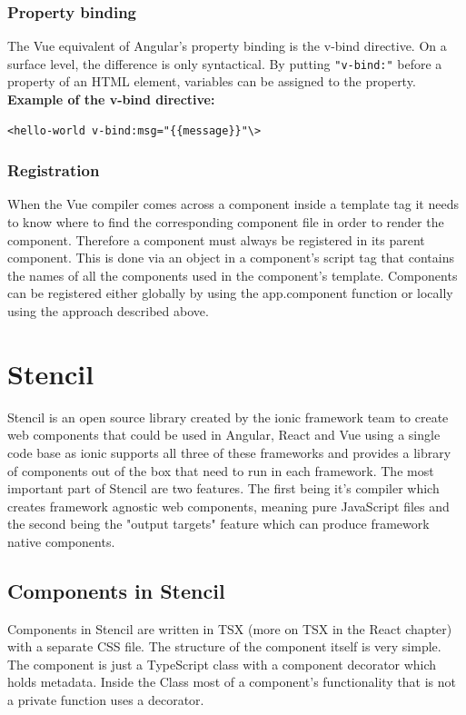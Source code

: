 \subsubsection{Property binding}
The Vue equivalent of Angular's property binding is the v-bind directive. On a surface level, the difference is only syntactical. By putting \verb+"v-bind:"+
before a property of an HTML element, variables can be assigned to the property.\\
\textbf{Example of the v-bind directive:}
\begin{Verbatim}[frame=single]
 <hello-world v-bind:msg="{{message}}"\>
\end{Verbatim}
\subsubsection{Registration}
When the Vue compiler comes across a component inside a template tag it needs to know where to find the corresponding component file in order to render the component. Therefore a component must always be registered in its parent component. This is done via an object in a component's script tag that contains the names of all the components used in the component's template.
Components can be registered either globally by using the app.component function or locally using the approach described above.

\section{Stencil}
Stencil is an open source library created by the ionic framework team to create web components that could be used in Angular, React and Vue using a single code base as ionic supports all three of these frameworks and provides a library of components out of the box that need to run in each framework. The most important part of Stencil are two features. The first being it's compiler which creates framework agnostic web  components, meaning pure JavaScript files and the second being the "output targets" feature which can produce framework native components.

\subsection{Components in Stencil}
Components in Stencil are written in TSX (more on TSX in the React chapter) with a separate CSS file. The structure of the component itself is very simple. The component is just a TypeScript class with a component decorator which holds metadata. Inside the Class most of a component's functionality that is not a private function uses a decorator.

